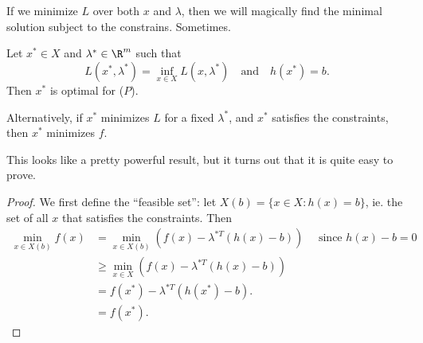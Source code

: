 \documentclass[a4paper]{article}
\begin{document}
If we minimize $L$ over both $x$ and $\lambda$, then we will magically find the minimal solution subject to the constrains. Sometimes.

\begin{thm}
  Let $x^*\in X$ and $\lambda^*\in \R^m$ such that
  \[
    L(x^* ,\lambda^*) = \inf_{x\in X}L(x, \lambda^*)\quad\text{and}\quad h(x^*) = b.
  \]
  Then $x^*$ is optimal for ($P$).

  Alternatively, if $x^*$ minimizes $L$ for a fixed $\lambda^*$, and $x^*$ satisfies the constraints, then $x^*$ minimizes $f$.
\end{thm}
This looks like a pretty powerful result, but it turns out that it is quite easy to prove.

\begin{proof}
  We first define the ``feasible set'': let $X(b) = \{x\in X: h(x) = b\}$, ie. the set of all $x$ that satisfies the constraints. Then
  \begin{align*}
    \min_{x\in X(b)} f(x) &= \min_{x\in X(b)} (f(x) - \lambda^{*T}(h(x) - b))\quad\text{ since $h(x) - b = 0$}\\
    &\geq \min_{x\in X} (f(x) - \lambda^{*T}(h(x) - b))\\
    &= f(x^*) - \lambda^{*T}(h(x^*) - b).\\
    &= f(x^*).
  \end{align*}
\end{proof}
\end{document}
